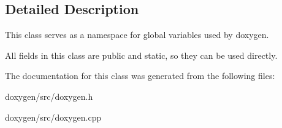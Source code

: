 \subsection{Detailed Description}
This class serves as a namespace for global variables used by doxygen. 

All fields in this class are public and static, so they can be used directly. 

The documentation for this class was generated from the following files\+:\begin{DoxyCompactItemize}
\item 
doxygen/src/doxygen.\+h\item 
doxygen/src/doxygen.\+cpp\end{DoxyCompactItemize}
